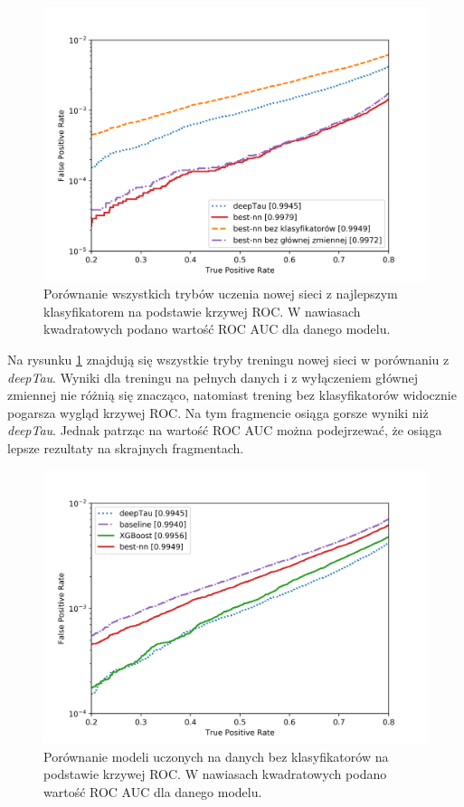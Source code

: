 \documentclass{pracalicmgr}
\begin{document}
	\begin{figure}[H]
	\centering
	\includegraphics[width=1\textwidth]{new_network.png}
	\caption{Porównanie wszystkich trybów uczenia nowej sieci z najlepszym klasyfikatorem na podstawie krzywej ROC. W nawiasach kwadratowych podano wartość ROC AUC dla danego modelu.}
	\label{fig:res_new}	
	\end{figure}
	
	Na rysunku \ref{fig:res_new} znajdują się wszystkie tryby treningu nowej sieci w porównaniu z \textit{deepTau}. Wyniki dla treningu na pełnych danych i z wyłączeniem głównej zmiennej nie różnią się znacząco, natomiast trening bez klasyfikatorów widocznie pogarsza wygląd krzywej ROC. Na tym fragmencie osiąga gorsze wyniki niż \textit{deepTau}. Jednak patrząc na wartość ROC AUC można podejrzewać, że osiąga lepsze rezultaty na skrajnych fragmentach.
	
	\begin{figure}[H]
	\centering
	\includegraphics[width=1\textwidth]{without_disc.png}
	\caption{Porównanie modeli uczonych na danych bez klasyfikatorów na podstawie krzywej ROC. W nawiasach kwadratowych podano wartość ROC AUC dla danego modelu.}
	\label{fig:res_disc}
	\end{figure}
	
\end{document}

